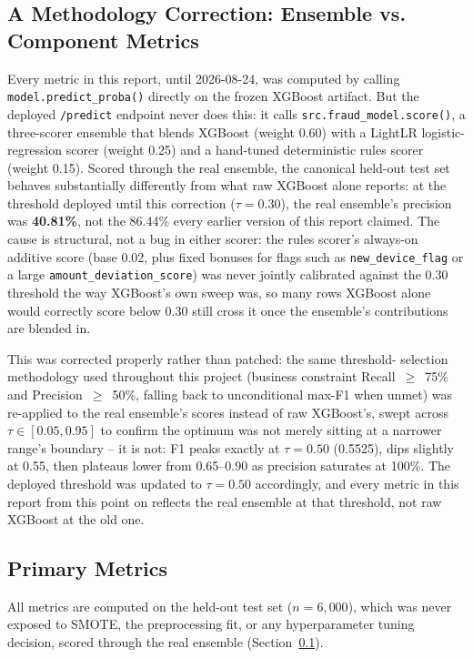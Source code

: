 \documentclass[conference]{IEEEtran}
\begin{document}
\subsection{A Methodology Correction: Ensemble vs. Component Metrics}
\label{sec:ensemble-correction}

Every metric in this report, until 2026-08-24, was computed by calling
\texttt{model.predict\_proba()} directly on the frozen XGBoost artifact.
But the deployed \texttt{/predict} endpoint never does this: it calls
\texttt{src.fraud\_model.score()}, a three-scorer ensemble that blends
XGBoost (weight 0.60) with a LightLR logistic-regression scorer (weight
0.25) and a hand-tuned deterministic rules scorer (weight 0.15). Scored
through the real ensemble, the canonical held-out test set behaves
substantially differently from what raw XGBoost alone reports: at the
threshold deployed until this correction ($\tau=0.30$), the real
ensemble's precision was \textbf{40.81\%}, not the 86.44\% every earlier
version of this report claimed. The cause is structural, not a bug in
either scorer: the rules scorer's always-on additive score (base 0.02,
plus fixed bonuses for flags such as \texttt{new\_device\_flag} or a large
\texttt{amount\_deviation\_score}) was never jointly calibrated against
the 0.30 threshold the way XGBoost's own sweep was, so many rows XGBoost
alone would correctly score below 0.30 still cross it once the ensemble's
contributions are blended in.

This was corrected properly rather than patched: the same threshold-
selection methodology used throughout this project (business constraint
Recall~$\geq$~75\% and Precision~$\geq$~50\%, falling back to
unconditional max-F1 when unmet) was re-applied to the real ensemble's
scores instead of raw XGBoost's, swept across $\tau \in [0.05, 0.95]$ to
confirm the optimum was not merely sitting at a narrower range's boundary
-- it is not: F1 peaks exactly at $\tau=0.50$ (0.5525), dips slightly at
0.55, then plateaus lower from 0.65--0.90 as precision saturates at
100\%. The deployed threshold was updated to $\tau=0.50$ accordingly, and
every metric in this report from this point on reflects the real ensemble
at that threshold, not raw XGBoost at the old one.

\subsection{Primary Metrics}

All metrics are computed on the held-out test set ($n = 6{,}000$),
which was never exposed to SMOTE, the preprocessing fit, or any
hyperparameter tuning decision, scored through the real ensemble
(Section~\ref{sec:ensemble-correction}).
\end{document}
